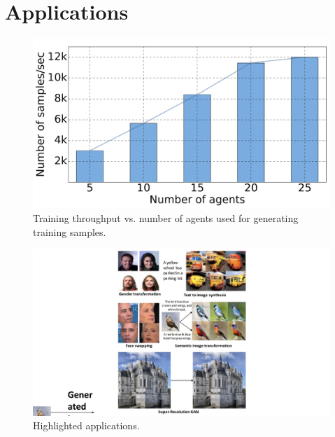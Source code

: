 \section{Applications}
\label{sec:experiment}


\begin{figure}
	\centering%
		\includegraphics[scale=0.19, trim={0cm 0.39cm 0cm 1.cm},clip]{figures/evaluation/drl_results2.png}
	\caption{Training throughput vs. number of agents used for generating training samples.}
	\label{fig:drl_results}
\end{figure} 

\begin{figure}
	\centering   %
	\includegraphics[scale=0.48, trim={9.5cm 0.2cm 9.5cm 0.2cm},clip]{figures/more_app4}
	\caption{Highlighted \tl applications.}
	\label{fig:more_app}
\end{figure} 

